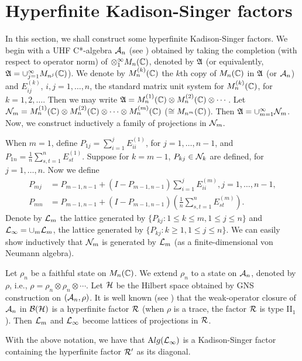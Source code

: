 \section{Hyperfinite Kadison-Singer factors}

\noindent In this section, we shall construct some hyperfinite
Kadison-Singer factors. We begin with a UHF C*-algebra $\mathcal A_n$ (see
\cite{G}) obtained by taking the completion (with respect to operator
norm) of $\otimes_{1}^\infty M_n(\mathbb C)$, denoted by $\mathfrak A$ (or
equivalently, $\mathfrak A=\cup_{j=1}^\infty M_{n^j}(\mathbb C)$). We denote by
$M_n^{(k)}(\mathbb C)$ the $k$th copy of $M_n(\mathbb C)$ in $\mathfrak A$ (or $\mathcal A_n$)
and $E_{ij}^{(k)}$, $i,j=1,\ldots,n$, the standard matrix unit
system for $M_n^{(k)}(\mathbb C)$, for $k=1,2,\ldots$. Then we may write
$\mathfrak A=M_n^{(1)}(\mathbb C)\otimes M_n^{(2)}(\mathbb C)\otimes\cdots$.  Let
$\mathcal N_m=M_n^{(1)}(\mathbb C)\otimes M_n^{(2)}(\mathbb C)\otimes\cdots\otimes
M_n^{(m)}(\mathbb C)$ ($\cong M_{n^m}(\mathbb C)$). Then
$\mathfrak A=\cup_{m=1}^\infty\mathcal N_m$. Now, we construct inductively a
family of projections in $\mathcal N_m$.

When $m=1$, define $P_{1j}=\sum_{i=1}^j E_{ii}^{(1)}$, for
$j=1,\ldots, n-1$, and $P_{1n}=\frac1n\sum_{s,t=1}^n
E_{st}^{(1)}$. Suppose for $k= m-1$, $P_{kj}\in\mathcal N_k$ are
defined, for $j=1,\ldots, n$. Now we define
\begin{align}
P_{mj}&=P_{m-1,n-1}+ (I-P_{m-1,n-1})\sum_{i=1}^j E_{ii}^{(m)},
 j=1,\ldots, n-1, \\
P_{mn}&=P_{m-1, n-1} +(I-P_{m-1,n-1})\left(\frac{1}{n} \sum_{s,t=1}^n
E_{st}^{(m)}\right) .
\end{align}
Denote by $\mathcal L_{m}$ the lattice generated by $\{ P_{kj}: 1\leq k\leq m, 1\leq j \leq n \}$ and $\mathcal L_\infty=\cup_m\mathcal L_m$, the lattice generated by $\{P_{kj}: k\geq 1, 1\leq j\leq n\}$. We can easily show
inductively that $\mathcal N_m$ is generated by $\mathcal L_m$ (as a
finite-dimensional von Neumann algebra).

Let $\rho_n$ be a faithful state on $M_n(\mathbb C)$. We extend $\rho_n$
to a state on $\mathcal A_n$, denoted by $\rho$, i.e.,
$\rho=\rho_n\otimes\rho_n\otimes\cdots$. Let $\mathcal H$ be the Hilbert
space obtained by GNS construction on $(\mathcal A_n,\rho)$. It is well
known (see \cite{P}) that the weak-operator closure of $\mathcal A_n$ in
$\mathcal B(\mathcal H)$ is a hyperfinite factor $\mathcal R$ (when $\rho$ is a trace,
the factor $\mathcal R$ is type II$_1$). Then $\mathcal L_m$ and $\mathcal L_\infty$
become lattices of projections in $\mathcal R$.

\begin{theorem} 
With the
above notation, we have that $\mathrm Alg(\mathcal L_\infty)$ is a Kadison-Singer
factor containing the hyperfinite factor $\mathcal R'$ as its
diagonal.
\end{theorem}


